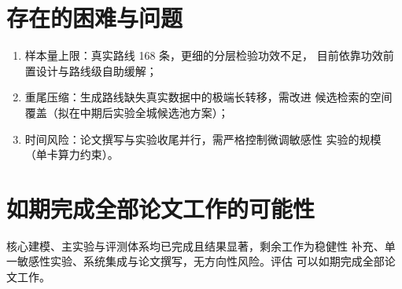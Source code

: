 \section{存在的困难与问题}

\begin{enumerate}
  \item 样本量上限：真实路线 168 条，更细的分层检验功效不足，
        目前依靠功效前置设计与路线级自助缓解；
  \item 重尾压缩：生成路线缺失真实数据中的极端长转移，需改进
        候选检索的空间覆盖（拟在中期后实验全城候选池方案）；
  \item 时间风险：论文撰写与实验收尾并行，需严格控制微调敏感性
        实验的规模（单卡算力约束）。
\end{enumerate}

\section{如期完成全部论文工作的可能性}

核心建模、主实验与评测体系均已完成且结果显著，剩余工作为稳健性
补充、单一敏感性实验、系统集成与论文撰写，无方向性风险。评估
可以如期完成全部论文工作。
